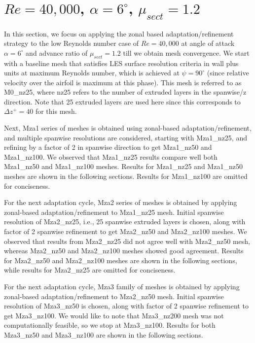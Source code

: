 \section{ $Re=40,000$,  $\alpha=6^\circ$, $\mu_{sect}=1.2$}

In this section, we focus on applying the zonal based adaptation/refinement strategy to the low Reynolds number case of $Re=40,000$ at angle of attack $\alpha=6^\circ$ and advance ratio of $\mu_{sect}=1.2$ till we obtain mesh convergence.
We start with a baseline mesh that satisfies LES surface resolution criteria in wall plus units at maximum Reynolds number, which is achieved at $\psi=90^\circ$ (since relative velocity over the airfoil is maximum at this phase). 
This mesh is referred to as M0\_nz25, where nz25 refers to the number of extruded layers in the spanwise/z direction. Note that 25 extruded layers are used here since this corresponds to $\Delta z^+ = 40$ for this mesh.

Next, Mza1 series of meshes is obtained using zonal-based adaptation/refinement, and multiple spanwise resolutions are considered, starting with Mza1\_nz25, and refining by a factor of 2 in spanwise direction to get Mza1\_nz50 and Mza1\_nz100.
We observed that Mza1\_nz25 results compare well both Mza1\_nz50 and Mza1\_nz100 meshes.
Results for Mza1\_nz25 and Mza1\_nz50 meshes are shown in the following sections.
Results for Mza1\_nz100 are omitted for conciseness.

For the next adaptation cycle, Mza2 series of meshes is obtained by applying  zonal-based adaptation/refinement to Mza1\_nz25 mesh.
Initial spanwise resolution of Mza2\_nz25, i.e., 25 spanwise extruded layers is chosen, along with factor of 2 spanwise refinement to get Mza2\_nz50 and Mza2\_nz100 meshes. 
We observed that results from Mza2\_nz25 did not agree well with Mza2\_nz50 mesh, whereas Mza2\_nz50 and Mza2\_nz100 meshes showed good agreement.
Results for Mza2\_nz50 and Mza2\_nz100 meshes are shown in the following sections, while results for Mza2\_nz25 are omitted for conciseness.

For the next adaptation cycle, Mza3 family of meshes is obtained by applying  zonal-based adaptation/refinement to Mza2\_nz50 mesh. 
Initial spanwise resolution of Mza3\_nz50 is chosen, along with factor of 2 spanwise refinement to get Mza3\_nz100. 
We would like to note that Mza3\_nz200 mesh was not computationally feasible, so we stop at Mza3\_nz100.
Results for both Mza3\_nz50 and Mza3\_nz100 are shown in the following sections.

